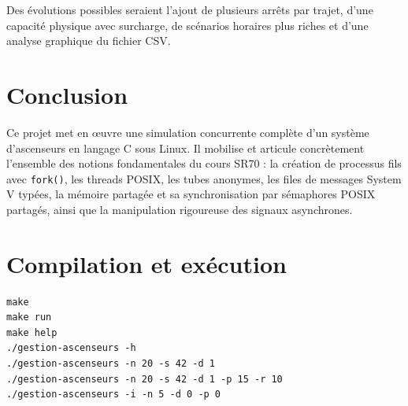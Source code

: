 \documentclass[11pt,a4paper]{article}
\begin{document}
Des évolutions possibles seraient l'ajout de plusieurs arrêts par trajet, d'une capacité physique avec surcharge, de scénarios horaires plus riches et d'une analyse graphique du fichier CSV.

\section{Conclusion}

Ce projet met en œuvre une simulation concurrente complète d'un système d'ascenseurs en langage C sous Linux. Il mobilise et articule concrètement l'ensemble des notions fondamentales du cours SR70 : la création de processus fils avec \texttt{fork()}, les threads POSIX, les tubes anonymes, les files de messages System V typées, la mémoire partagée et sa synchronisation par sémaphores POSIX partagés, ainsi que la manipulation rigoureuse des signaux asynchrones.

\appendix
\section{Compilation et exécution}
\begin{lstlisting}[style=terminal]
make
make run
make help
./gestion-ascenseurs -h
./gestion-ascenseurs -n 20 -s 42 -d 1
./gestion-ascenseurs -n 20 -s 42 -d 1 -p 15 -r 10
./gestion-ascenseurs -i -n 5 -d 0 -p 0
\end{lstlisting}
\end{document}
